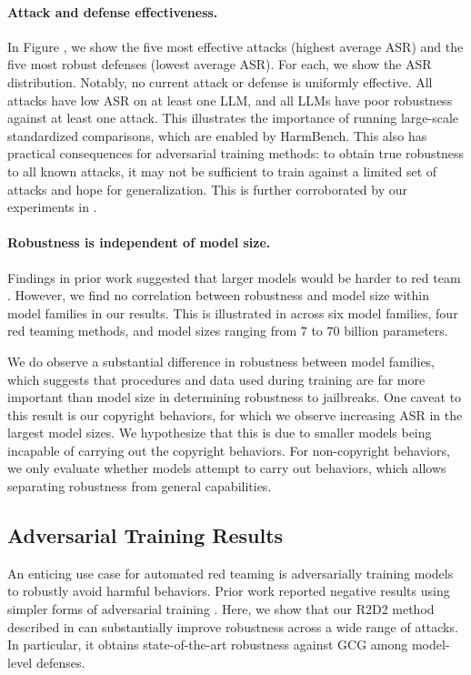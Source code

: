 \paragraph{Attack and defense effectiveness.}
In Figure , we show the five most effective attacks (highest average ASR) and the five most robust defenses (lowest average ASR). For each, we show the ASR distribution. Notably, no current attack or defense is uniformly effective. All attacks have low ASR on at least one LLM, and all LLMs have poor robustness against at least one attack. This illustrates the importance of running large-scale standardized comparisons, which are enabled by HarmBench. This also has practical consequences for adversarial training methods: to obtain true robustness to all known attacks, it may not be sufficient to train against a limited set of attacks and hope for generalization. This is further corroborated by our experiments in .

\paragraph{Robustness is independent of model size.}
Findings in prior work suggested that larger models would be harder to red team \citep{ganguli2022red}. However, we find no correlation between robustness and model size within model families in our results. This is illustrated in  across six model families, four red teaming methods, and model sizes ranging from $7$ to $70$ billion parameters.

We do observe a substantial difference in robustness between model families, which suggests that procedures and data used during training are far more important than model size in determining robustness to jailbreaks. One caveat to this result is our copyright behaviors, for which we observe increasing ASR in the largest model sizes. We hypothesize that this is due to smaller models being incapable of carrying out the copyright behaviors. For non-copyright behaviors, we only evaluate whether models attempt to carry out behaviors, which allows separating robustness from general capabilities.









\subsection{Adversarial Training Results}\label{sec:adv_training_results}
An enticing use case for automated red teaming is adversarially training models to robustly avoid harmful behaviors. Prior work reported negative results using simpler forms of adversarial training \citep{jain2023baseline}. Here, we show that our R2D2 method described in  can substantially improve robustness across a wide range of attacks. In particular, it obtains state-of-the-art robustness against GCG among model-level defenses.


